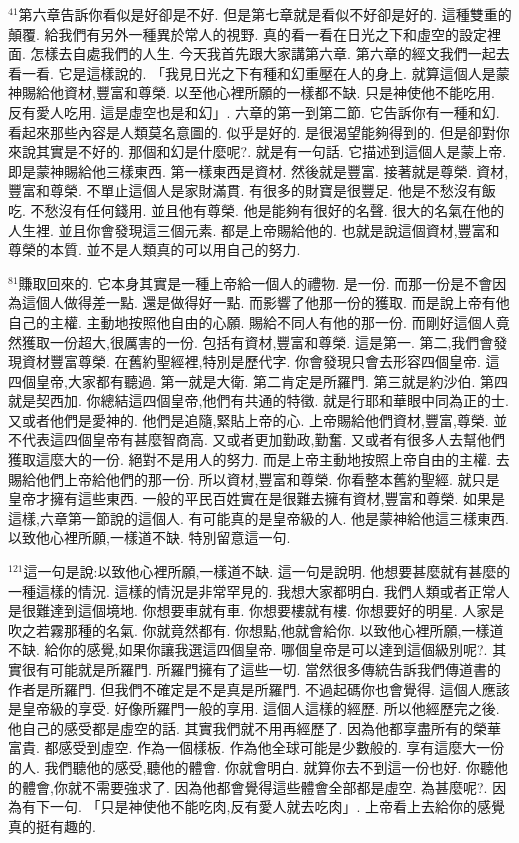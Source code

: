 \documentclass{book}
\begin{document}
$^{41}$第六章告訴你看似是好卻是不好.
但是第七章就是看似不好卻是好的.
這種雙重的顛覆.
給我們有另外一種異於常人的視野.
真的看一看在日光之下和虛空的設定裡面.
怎樣去自處我們的人生.
今天我首先跟大家講第六章.
第六章的經文我們一起去看一看.
它是這樣說的.
「我見日光之下有種和幻重壓在人的身上.
就算這個人是蒙神賜給他資材,豐富和尊榮.
以至他心裡所願的一樣都不缺.
只是神使他不能吃用.
反有愛人吃用.
這是虛空也是和幻」.
六章的第一到第二節.
它告訴你有一種和幻.
看起來那些內容是人類莫名意圖的.
似乎是好的.
是很渴望能夠得到的.
但是卻對你來說其實是不好的.
那個和幻是什麼呢?.
就是有一句話.
它描述到這個人是蒙上帝.
即是蒙神賜給他三樣東西.
第一樣東西是資材.
然後就是豐富.
接著就是尊榮.
資材,豐富和尊榮.
不單止這個人是家財滿貫.
有很多的財寶是很豐足.
他是不愁沒有飯吃.
不愁沒有任何錢用.
並且他有尊榮.
他是能夠有很好的名聲.
很大的名氣在他的人生裡.
並且你會發現這三個元素.
都是上帝賜給他的.
也就是說這個資材,豐富和尊榮的本質.
並不是人類真的可以用自己的努力.

$^{81}$賺取回來的.
它本身其實是一種上帝給一個人的禮物.
是一份.
而那一份是不會因為這個人做得差一點.
還是做得好一點.
而影響了他那一份的獲取.
而是說上帝有他自己的主權.
主動地按照他自由的心願.
賜給不同人有他的那一份.
而剛好這個人竟然獲取一份超大,很厲害的一份.
包括有資材,豐富和尊榮.
這是第一.
第二,我們會發現資材豐富尊榮.
在舊約聖經裡,特別是歷代字.
你會發現只會去形容四個皇帝.
這四個皇帝,大家都有聽過.
第一就是大衛.
第二肯定是所羅門.
第三就是約沙伯.
第四就是契西加.
你總結這四個皇帝,他們有共通的特徵.
就是行耶和華眼中同為正的士.
又或者他們是愛神的.
他們是追隨,緊貼上帝的心.
上帝賜給他們資材,豐富,尊榮.
並不代表這四個皇帝有甚麼智商高.
又或者更加勤政,勤奮.
又或者有很多人去幫他們獲取這麼大的一份.
絕對不是用人的努力.
而是上帝主動地按照上帝自由的主權.
去賜給他們上帝給他們的那一份.
所以資材,豐富和尊榮.
你看整本舊約聖經.
就只是皇帝才擁有這些東西.
一般的平民百姓實在是很難去擁有資材,豐富和尊榮.
如果是這樣,六章第一節說的這個人.
有可能真的是皇帝級的人.
他是蒙神給他這三樣東西.
以致他心裡所願,一樣道不缺.
特別留意這一句.

$^{121}$這一句是說:以致他心裡所願,一樣道不缺.
這一句是說明.
他想要甚麼就有甚麼的一種這樣的情況.
這樣的情況是非常罕見的.
我想大家都明白.
我們人類或者正常人是很難達到這個境地.
你想要車就有車.
你想要樓就有樓.
你想要好的明星.
人家是吹之若霧那種的名氣.
你就竟然都有.
你想點,他就會給你.
以致他心裡所願,一樣道不缺.
給你的感覺,如果你讓我選這四個皇帝.
哪個皇帝是可以達到這個級別呢?.
其實很有可能就是所羅門.
所羅門擁有了這些一切.
當然很多傳統告訴我們傳道書的作者是所羅門.
但我們不確定是不是真是所羅門.
不過起碼你也會覺得.
這個人應該是皇帝級的享受.
好像所羅門一般的享用.
這個人這樣的經歷.
所以他經歷完之後.
他自己的感受都是虛空的話.
其實我們就不用再經歷了.
因為他都享盡所有的榮華富貴.
都感受到虛空.
作為一個樣板.
作為他全球可能是少數般的.
享有這麼大一份的人.
我們聽他的感受,聽他的體會.
你就會明白.
就算你去不到這一份也好.
你聽他的體會,你就不需要強求了.
因為他都會覺得這些體會全部都是虛空.
為甚麼呢?.
因為有下一句.
「只是神使他不能吃肉,反有愛人就去吃肉」.
上帝看上去給你的感覺真的挺有趣的.
\end{document}
